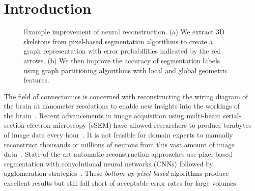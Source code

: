 \section{Introduction}

\begin{figure}[t]
	\caption{Example improvement of neural reconstruction. (a) We extract 3D skeletons from pixel-based segmentation algorithms to create a graph representation with error probabilities indicated by the red arrows. (b) We then improve the accuracy of segmentation labels using graph partitioning algorithms with local and global geometric features.}
	\label{fig:teaser}
\end{figure}

The field of connectomics is concerned with reconstructing the wiring diagram of the brain at nanometer resolutions to enable new insights into the workings of the brain~\cite{kasthuri2015saturated,haehn2017scalable}. Recent advancements in image acquisition using multi-beam serial-section electron microscopy (sSEM) have allowed researchers to produce terabytes of image data every hour~\cite{hildebrand2017whole}. It is not feasible for domain experts to manually reconstruct thousands or millions of neurons from this vast amount of image data~\cite{haehn2014design}. State-of-the-art automatic reconstruction approaches use pixel-based segmentation with convolutional neural networks (CNNs) followed by agglomeration strategies~\cite{seymour2016rhoananet,nunez2014graph,parag2017anisotropic,zlateski2015image,lee2015recursive,ronneberger2015u}. %
These \textit{bottom-up pixel-based} algorithms produce excellent results but still fall short of acceptable error rates for large volumes.

